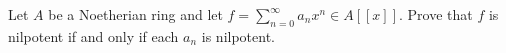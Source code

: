 \begin{exercise}
Let \(A\) be a Noetherian ring and let \(f = \sum_{n=0}^\infty a_n x^n \in A[[x]]\).
Prove that \(f\) is nilpotent if and only if each \(a_n\) is nilpotent.
\end{exercise}
